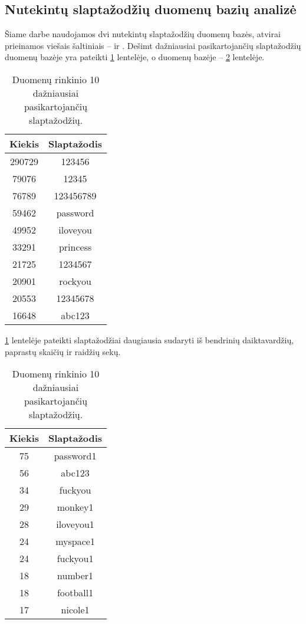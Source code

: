 \documentclass{VUMIFInfBakalaurinis}
\begin{document}
\subsection{Nutekintų slaptažodžių duomenų bazių analizė} \label{sec:db-analize}
Šiame darbe naudojamos dvi nutekintų slaptažodžių duomenų bazės, atvirai 
prieinamos viešais šaltiniais --  ir . 
Dešimt dažniausiai pasikartojančių slaptažodžių duomenų bazėje 
 yra pateikti \ref{tab:rockyou10} lentelėje, o duomenų bazėje 
 -- \ref{tab:myspace10} lentelėje.

\begin{table}[hb]
  \centering
  \begin{tabular}{|c|c|}
    \hline \textbf{Kiekis} & \textbf{Slaptažodis} \\
    \hline 290729 & 123456 \\
    \hline 79076 & 12345 \\
    \hline 76789 & 123456789 \\
    \hline 59462 & password \\
    \hline 49952 & iloveyou \\
    \hline 33291 & princess \\
    \hline 21725 & 1234567 \\
    \hline 20901 & rockyou \\
    \hline 20553 & 12345678 \\
    \hline 16648 & abc123 \\
    \hline
  \end{tabular}
  \caption{
    Duomenų rinkinio  10 dažniausiai pasikartojančių 
    slaptažodžių.
  }
  \label{tab:rockyou10}
\end{table}

\ref{tab:rockyou10} lentelėje pateikti slaptažodžiai daugiausia sudaryti iš 
bendrinių daiktavardžių, paprastų skaičių ir raidžių sekų.

\begin{table}[ht]
  \centering
  \begin{tabular}{|c|c|}
    \hline \textbf{Kiekis} & \textbf{Slaptažodis} \\
    \hline 75 & password1 \\
    \hline 56 & abc123 \\
    \hline 34 & fuckyou \\
    \hline 29 & monkey1 \\
    \hline 28 & iloveyou1 \\
    \hline 24 & myspace1 \\
    \hline 24 & fuckyou1 \\
    \hline 18 & number1 \\
    \hline 18 & football1 \\
    \hline 17 & nicole1 \\
    \hline
  \end{tabular}
  \caption{
    Duomenų rinkinio  10 dažniausiai pasikartojančių 
    slaptažodžių.
  }
  \label{tab:myspace10}
\end{table}
\end{document}
